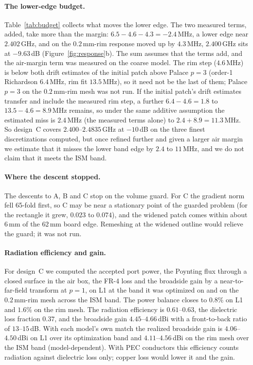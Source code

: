 \documentclass{anvil-paper}
\begin{document}
\paragraph{The lower-edge budget.}
Table~\ref{tab:budget} collects what moves the lower edge. The two measured
terms, added, take more than the margin: $6.5 - 4.6 - 4.3 = -2.4$\,MHz, a
lower edge near $2.402$\,GHz, and on the $0.2$\,mm-rim response moved up by
$4.3$\,MHz, $2.400$\,GHz sits at $-9.63$\,dB (Figure~\ref{fig:response}b).
The sum assumes that the terms add, and the air-margin term was measured on
the coarse model. The rim step ($4.6$\,MHz) is below both drift estimates of
the initial patch above Palace $p = 3$ (order-1 Richardson $6.4$\,MHz, rim
fit $13.5$\,MHz), so it need not be the last of them; Palace $p = 3$ on the
$0.2$\,mm-rim mesh was not run. If the initial patch's drift estimates transfer
and include the measured rim step, a further $6.4 - 4.6 = 1.8$ to
$13.5 - 4.6 = 8.9$\,MHz remains, so under the same additive assumption the
estimated miss is $2.4$\,MHz (the measured terms alone) to
$2.4 + 8.9 = 11.3$\,MHz. So design~C covers $2.400$--$2.4835$\,GHz at
$-10$\,dB on the three finest discretizations computed, but once refined
further and given a larger air margin we estimate that it misses the lower
band edge by $2.4$ to $11$\,MHz, and we do not claim that it meets the ISM
band.

\paragraph{Where the descent stopped.}
The descents to A, B and C stop on the volume guard. For C the gradient norm fell 65-fold first, so C may be
near a stationary point of the guarded problem (for the rectangle it grew,
$0.023$ to $0.074$), and the widened patch comes within about $6$\,mm of
the $62$\,mm board edge. Remeshing at the widened outline would relieve the
guard; it was not run.

\paragraph{Radiation efficiency and gain.}
For design~C we computed the accepted port power, the Poynting flux through
a closed surface in the air box, the FR-4 loss and the broadside gain by a
near-to-far-field transform at $p = 1$, on L1 at the band it was optimized
on and on the $0.2$\,mm-rim mesh across the ISM band. The power balance
closes to $0.8\%$ on L1 and $1.6\%$ on the rim mesh. The radiation
efficiency is $0.61$--$0.63$, the dielectric loss fraction $0.37$, and the
broadside gain $4.45$--$4.66$\,dBi with a front-to-back ratio of
$13$--$15$\,dB. With each model's own match the realized broadside gain is
$4.06$--$4.50$\,dBi on L1 over its optimization band and $4.11$--$4.56$\,dBi
on the rim mesh over the ISM band (model-dependent). With PEC
conductors this efficiency counts radiation against dielectric loss only;
copper loss would lower it and the gain.
\end{document}
